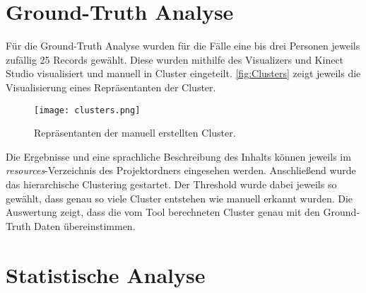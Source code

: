 \section{Ground-Truth Analyse}
\label{6-GroundTruth}
Für die Ground-Truth Analyse wurden für die Fälle eine bis drei Personen jeweils zufällig 25 Records gewählt.
Diese wurden mithilfe des Visualizers und Kinect Studio visualisiert und manuell in Cluster eingeteilt.
\autoref{fig:Clusters} zeigt jeweils die Visualisierung eines Repräsentanten der Cluster.
\begin{figure}[ht]
    \begin{center}
    \texttt{[image: clusters.png]}
    \end{center}
    \caption{Repräsentanten der manuell erstellten Cluster.}
    \label{fig:Clusters}
\end{figure}
Die Ergebnisse und eine sprachliche Beschreibung des Inhalts
können jeweils im \emph{resources}-Verzeichnis des Projektordners eingesehen werden.
Anschließend wurde das hierarchische Clustering gestartet.
Der Threshold wurde dabei jeweils so gewählt,
dass genau so viele Cluster entstehen wie manuell erkannt wurden.
Die Auswertung zeigt, dass die vom Tool berechneten Cluster genau mit den Ground-Truth Daten übereinstimmen.

\section{Statistische Analyse}
\label{6-Statistical}